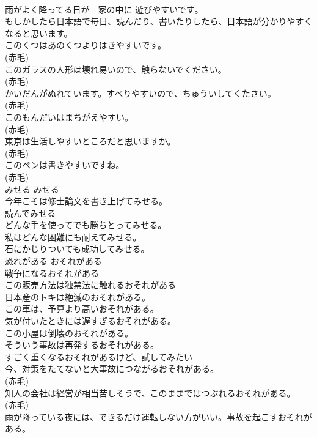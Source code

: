 \documentclass[8pt]{extreport}
\begin{document}
\begin{CJK}{UTF8}{min}
\\	雨がよく降ってる日が　家の中に 遊びやすいです｡  
\\	もしかしたら日本語で毎日、読んだり、書いたりしたら、日本語が分かりやすくなると思います。  
\\	このくつはあのくつよりはきやすいです。  
\\	(赤毛)
\\	このガラスの人形は壊れ易いので、触らないでください。  
\\	(赤毛)
\\	かいだんがぬれています。すべりやすいので、ちゅういしてくたさい。  
\\	(赤毛)
\\	このもんだいはまちがえやすい。  
\\	(赤毛)
\\	東京は生活しやすいところだと思いますか。  
\\	(赤毛)
\\	このペンは書きやすいですね。  
\\	(赤毛)
\\	みせる	みせる	
\\	今年こそは修士論文を書き上げてみせる。  
\\	読んでみせる  
\\	どんな手を使ってでも勝ちとってみせる。   
\\	私はどんな困難にも耐えてみせる。   
\\	石にかじりついても成功してみせる。  
\\	恐れがある	おそれがある	
\\	戦争になるおそれがある  
\\	この販売方法は独禁法に触れるおそれがある  
\\	日本産のトキは絶滅のおそれがある。  
\\	この車は、予算より高いおそれがある。  
\\	気が付いたときには遅すぎるおそれがある。  
\\	この小屋は倒壊のおそれがある。   
\\	そういう事故は再発するおそれがある。   
\\	すごく重くなるおそれがあるけど、試してみたい   
\\	今、対策をたてないと大事故につながるおそれがある。  
\\	(赤毛)
\\	知人の会社は経営が相当苦しそうで、このままではつぶれるおそれがある。  
\\	(赤毛)
\\	雨が降っている夜には、できるだけ運転しない方がいい。事故を起こすおそれがある。  

\end{CJK}
\end{document}
